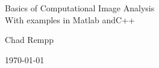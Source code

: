 \begin{titlepage}
	\begin{center}
		\vspace*{1in}
		{\LARGE Basics of Computational Image Analysis\\}
		{\large With examples in Matlab andC++}
		\par
		\vspace{0.75in}
		{\large Chad Rempp}
		\par
		\vfill
		\vspace{0.25in}
		\par
		\vspace{0.25in}
		\par
		\vspace{0.25in}
		\today
	\end{center}
\end{titlepage}

